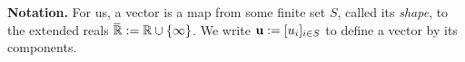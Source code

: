 \documentclass[twoside]{article}
\begin{document}
\textbf{Notation.}
%
%
For us, a vector is a map from some finite set $S$, called its \emph{shape}, to the extended reals $\mskip1mu\overline{\mskip-1mu\mathbb R\!}\, := \mathbb R \cup \{\infty\}$.
We write $\mathbf{u} := [u_i]_{i \in S}$ to define a vector by its components.
\end{document}
